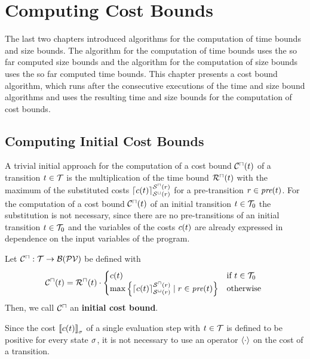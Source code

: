 \chapter{Computing Cost Bounds}

The last two chapters introduced algorithms for the computation of time bounds and size bounds.
The algorithm for the computation of time bounds uses the so far computed size bounds and the algorithm for the computation of size bounds uses the so far computed time bounds.
This chapter presents a cost bound algorithm, which runs after the consecutive executions of the time and size bound algorithms and uses the resulting time and size bounds for the computation of cost bounds.

\section{Computing Initial Cost Bounds}

A trivial initial approach for the computation of a cost bound ${\mathcal{C}^\sqcap}(t)$ of a transition $t \in \mathcal{T}$ is the multiplication of the time bound ${\mathcal{R}^\sqcap}(t)$ with the maximum of the substituted costs $\left\lceil c(t) \right\rceil^{{\mathcal{S}^\sqcap}(r)}_{{\mathcal{S}^\sqcup}(r)}$ for a pre-transition $r \in \emph{pre}(t)$.
For the computation of a cost bound ${\mathcal{C}^\sqcap}(t)$ of an initial transition $t \in \mathcal{T}_0$ the substitution is not necessary, since there are no pre-transitions of an initial transition $t \in \mathcal{T}_0$ and the variables of the costs $c(t)$ are already expressed in dependence on the input variables of the program.

\begin{definition}
  Let ${\mathcal{C}^\sqcap}: \mathcal{T} \rightarrow \mathcal{B}(\mathcal{PV})$ be defined with
  \[ {\mathcal{C}^\sqcap}(t) = {\mathcal{R}^\sqcap}(t) \cdot
  \begin{cases}
    c(t) & \text{if } t \in \mathcal{T}_0 \\
    \max \left\lbrace \left\lceil c(t) \right\rceil^{{\mathcal{S}^\sqcap}(r)}_{{\mathcal{S}^\sqcup}(r)} \mid r \in \emph{pre}(t) \right\rbrace & \text{otherwise }
  \end{cases}
  \]
  Then, we call ${\mathcal{C}^\sqcap}$ an \textbf{initial cost bound}. 
\end{definition}

Since the cost $\left\llbracket c(t) \right\rrbracket_{\sigma}$ of a single evaluation step with $t \in \mathcal{T}$ is defined to be positive for every state $\sigma$, it is not necessary to use an operator $\left\langle \cdot \right\rangle$ on the cost of a transition.

